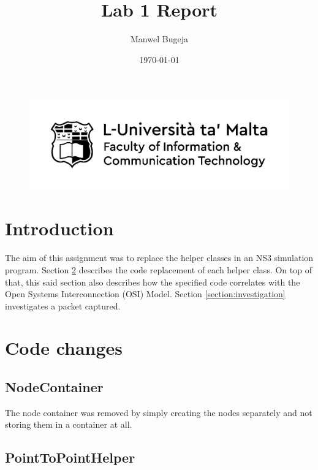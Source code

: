 \documentclass[a4paper, 12pt]{article}
\begin{document}
\begin{figure}
    \centering
    \includegraphics[width=1\textwidth]{Logo}
\end{figure}

\title{Lab 1 Report}
\author{Manwel Bugeja}
\date{\today}
\maketitle
  
\tableofcontents
\newpage

\section{Introduction}
The aim of this assignment was to replace the helper classes in an NS3 simulation program. Section \ref{section:description} describes the code replacement of each helper class. On top of that, this said section also describes how the specified code correlates with the  Open Systems Interconnection (OSI) Model. Section \ref{section:investigation} investigates a packet captured.

\section{Code changes}
\label{section:description}
\subsection{NodeContainer}
The node container was removed by simply creating the nodes separately and not storing them in a container at all. 

\subsection{PointToPointHelper}
\end{document}
